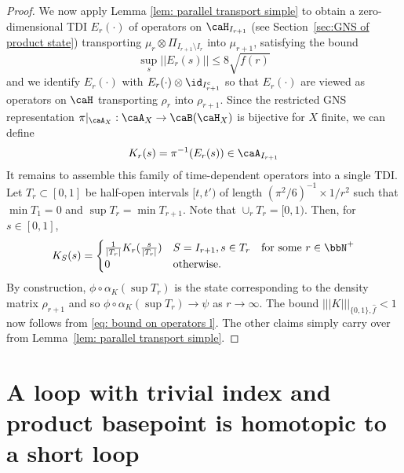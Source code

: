 \begin{proof}
	We now apply Lemma \ref{lem: parallel transport simple} to obtain a zero-dimensional TDI $E_r(\cdot)$ of operators on $\caH_{I_{r+1}}$ (see Section~\ref{sec:GNS of product state}) transporting $\mu_r\otimes \Pi_{I_{r+1}\setminus I_r}$ into  $\mu_{r+1}$, satisfying the bound 
	\begin{equation}\label{eq: bound on operators l}
	\sup_{s}||E_r(s)|| \leq 8 \sqrt{f(r)}
	\end{equation}
	and we identify $E_r(\cdot)$ with $E_r(\cdot)\otimes \id_{I_{r+1}^c}$ so that $E_r(\cdot)$ are viewed as operators on $\caH$ transporting $\rho_r$ into $\rho_{r+1}$. Since the restricted GNS representation $\pi|_{\caA_X}:\caA_X\to \caB(\caH_X)$ is bijective for $X$ finite, we can define
	$$
	K_r(s)=\pi^{-1}(E_r(s))  \in \caA_{I_{r+1}}
	$$
	It remains to assemble this family of time-dependent operators into a single TDI.
	Let $T_r \subset [0,1]$ be half-open intervals $[t,t')$ of length $(\pi^2/6)^{-1} \times 1/r^2$ such that $\min T_1=0$ and $\sup T_{r}=\min T_{r+1}$. Note that $\cup_{r} T_r=[0,1)$. Then, for $s\in [0,1]$,
	$$
	K_{S}(s)= \begin{cases}  \frac{1}{|T_r|}  K_r(\frac{s}{|T_r|})   &    S=I_{r+1}, s\in T_r \quad \text{for some $r\in \bbN^+$} \\
	0 & \text{otherwise}. \end{cases}
	$$
	By construction, $\phi\circ\alpha_K(\sup T_r)$ is the state corresponding to the density matrix $\rho_{r+1}$ and so $\phi\circ\alpha_K(\sup T_r)\to \psi$ as $r\to\infty$. The bound $ |||K|||_{\{0,1\},\hat{f}}<1$ now follows from \eqref{eq: bound on operators l}.  The other claims simply carry over from Lemma~\ref{lem: parallel transport simple}. 
\end{proof}






\section{A loop with trivial index and product basepoint is homotopic to a short loop}  \label{sec: trivial index loop is short}

